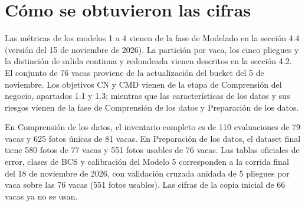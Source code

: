 \section*{Cómo se obtuvieron las cifras}

Las métricas de los modelos 1 a 4 vienen de la fase de Modelado en la sección 4.4 (versión del 15 de noviembre de 2026). La partición por vaca, los cinco pliegues y la distinción de salida continua y redondeada vienen descritos en la sección 4.2. El conjunto de 76 vacas proviene de la actualización del bucket del 5 de noviembre. Los objetivos CN y CMD vienen de la etapa de Comprensión del negocio, apartados 1.1 y 1.3; mientras que las características de los datos y sus riesgos vienen de la fase de Comprensión de los datos y Preparación de los datos.

En Comprensión de los datos, el inventario completo es de 110 evaluaciones de 79 vacas y 625 fotos únicas de 81 vacas. En Preparación de los datos, el dataset final tiene 580 fotos de 77 vacas y 551 fotos usables de 76 vacas. Las tablas oficiales de error, clases de BCS y calibración del Modelo 5 corresponden a la corrida final del 18 de noviembre de 2026, con validación cruzada anidada de 5 pliegues por vaca sobre las 76 vacas (551 fotos usables). Las cifras de la copia inicial de 66 vacas ya no se usan.

